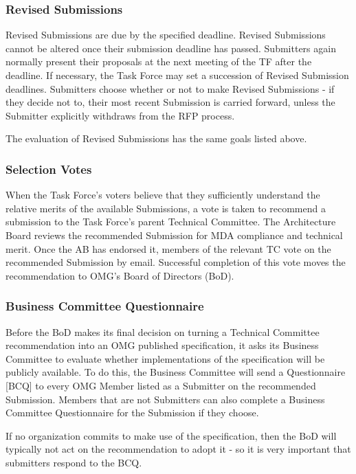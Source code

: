 \subsubsection{Revised Submissions}

Revised Submissions are due by the specified deadline. Revised Submissions cannot be altered once their submission deadline has passed. Submitters again normally present their proposals at the next meeting of the TF after the deadline. If necessary, the Task Force may set a succession of Revised Submission deadlines. Submitters choose whether or not to make Revised Submissions - if they decide not to, their most recent Submission is carried forward, unless the Submitter explicitly withdraws from the RFP process.

The evaluation of Revised Submissions has the same goals listed above.


\subsubsection{Selection Votes}

When the Task Force's voters believe that they sufficiently understand the relative merits of the available Submissions, a vote is taken to recommend a submission to the Task Force's parent Technical Committee. The Architecture Board reviews the recommended Submission for MDA compliance and technical merit. Once the AB has endorsed it, members of the relevant TC vote on the recommended Submission by email. Successful completion of this vote moves the recommendation to OMG's Board of Directors (BoD).


\subsubsection{Business Committee Questionnaire}

Before the BoD makes its final decision on turning a Technical Committee recommendation into an OMG published specification, it asks its Business Committee to evaluate whether implementations of the specification will be publicly available. To do this, the Business Committee will send a Questionnaire [BCQ] to every OMG Member listed as a Submitter on the recommended Submission. Members that are not Submitters can also complete a Business Committee Questionnaire for the Submission if they choose.

If no organization commits to make use of the specification, then the BoD will typically not act on the recommendation to adopt it - so it is very important that submitters respond to the BCQ.

